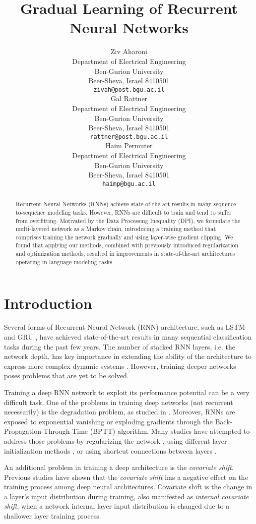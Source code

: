 \documentclass{article}
\title{Gradual Learning of Recurrent Neural Networks}
\author{
  Ziv Aharoni \\
  Department of Electrical Engineering\\
  Ben-Gurion University\\
  Beer-Sheva, Israel 8410501\\
  \texttt{zivah@post.bgu.ac.il} \\
\And
   Gal Rattner \\
   Department of Electrical Engineering \\
   Ben-Gurion University\\
   Beer-Sheva, Israel 8410501\\
   \texttt{rattner@post.bgu.ac.il} \\
   \AND
   Haim Permuter \\
   Department of Electrical Engineering \\
   Ben-Gurion University\\
   Beer-Sheva, Israel 8410501\\
   \texttt{haimp@bgu.ac.il} \\
}
\begin{document}
\maketitle

\begin{abstract}
Recurrent Neural Networks (RNNs) achieve state-of-the-art results in many sequence-to-sequence modeling tasks. 
However, RNNs are difficult to train and tend to suffer from overfitting. 
Motivated by the Data Processing Inequality (DPI), we formulate the multi-layered network as a Markov chain, introducing a training method that comprises training the network gradually and using layer-wise gradient clipping.
We found that applying our methods, combined with previously introduced regularization and optimization methods, resulted in improvements in state-of-the-art architectures operating in language modeling tasks.

\end{abstract}

\section{Introduction}
Several forms of Recurrent Neural Network (RNN) architecture, such as LSTM \cite{HOCHREITER} and GRU \cite{cho2014enc}, have achieved state-of-the-art results in many sequential classification tasks \cite{CHO,Hypernetworks,Resnets,Dropin,InitAndMomentum,RHN} during the past few years. 
The number of stacked RNN layers, i.e. the network depth, has key importance in extending the ability of the architecture to express more complex dynamic systems \cite{Bianchini, Montufar}. However, training deeper networks poses problems that are yet to be solved.
\par Training a deep RNN network to exploit its performance potential can be a very difficult task. 
One of the problems in training deep networks (not recurrent necessarily) is the degradation problem, as studied in \cite{Resnets}. 
Moreover, RNNs are exposed to exponential vanishing or exploding gradients through the Back-Propagation-Through-Time (BPTT) algorithm. 
Many studies have attempted to address those problems by regularizing the network \cite{RNNBatchNorm,VariationalDropout,Zaremba}, using different layer initialization methods \cite{GreedyLayerwiseInit, hinton2006fast}, or using shortcut connections between layers \cite{Resnets,Dropin,RHN}.

 An additional problem in training a deep architecture is the \textit{covariate shift}. Previous studies \cite{RNNBatchNorm, IofeSzegedy, Shimodaira} have shown that the \textit{covariate shift} has a negative effect on the training process among deep neural architectures. Covariate shift is the change in a layer's input distribution during training, also manifested as \textit{internal covariate shift}, when a network internal layer input distribution is changed due to a shallower layer training process.
\end{document}
